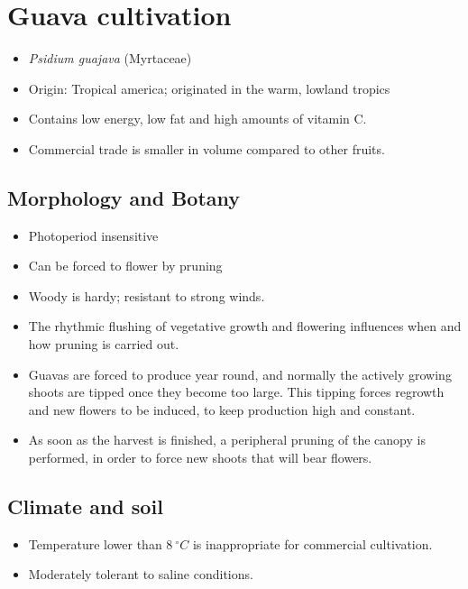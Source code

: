 \documentclass[
]{book}
\providecommand{\tightlist}{%
  \setlength{\itemsep}{0pt}\setlength{\parskip}{0pt}}
\begin{document}
\hypertarget{guava-cultivation}{%
\section{Guava cultivation}\label{guava-cultivation}}

\begin{itemize}
\tightlist
\item
  \emph{Psidium guajava} (Myrtaceae)
\item
  Origin: Tropical america; originated in the warm, lowland tropics
\item
  Contains low energy, low fat and high amounts of vitamin C.
\item
  Commercial trade is smaller in volume compared to other fruits.
\end{itemize}

\hypertarget{morphology-and-botany}{%
\subsection{Morphology and Botany}\label{morphology-and-botany}}

\begin{itemize}
\tightlist
\item
  Photoperiod insensitive
\item
  Can be forced to flower by pruning
\item
  Woody is hardy; resistant to strong winds.
\item
  The rhythmic flushing of vegetative growth and flowering influences when and how pruning is
  carried out.
\item
  Guavas are forced to produce year round, and normally the actively growing shoots are tipped once they become too large. This tipping forces regrowth and new flowers to be induced, to keep production high and constant.
\item
  As soon as the harvest is finished, a peripheral pruning of the canopy is performed, in order to force new shoots that will bear flowers.
\end{itemize}

\hypertarget{climate-and-soil}{%
\subsection{Climate and soil}\label{climate-and-soil}}

\begin{itemize}
\tightlist
\item
  Temperature lower than \(8\ ^\circ C\) is inappropriate for commercial cultivation.
\item
  Moderately tolerant to saline conditions.
\end{itemize}
\end{document}
